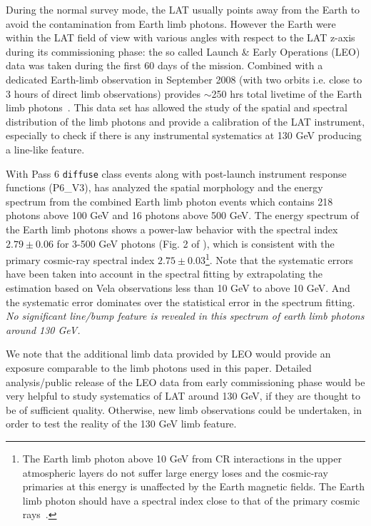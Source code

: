 \documentclass[aps,twocolumn,prd,superscriptaddress,showpacs,nofootinbib,fixfloat]{revtex4}
\begin{document}
During the normal survey mode, the LAT usually points away
from the Earth to avoid the contamination from Earth limb
photons. However the Earth were within the LAT field of view
with various angles with respect to the LAT z-axis during
its commissioning phase: the so called Launch \& Early
Operations (LEO) data was taken during the first 60 days of
the mission. Combined with a dedicated Earth-limb
observation in September 2008 (with two orbits i.e. close to
3 hours of direct limb observations) provides $\sim$250 hrs
total livetime of the Earth limb
photons~\cite{FermiLimb}. This data set has allowed the
study of the spatial and spectral distribution of the limb
photons and provide a calibration of the LAT instrument,
especially to check if there is any instrumental systematics
at 130 GeV producing a line-like feature.

With Pass 6 \texttt{diffuse} class events along with
post-launch instrument response functions (P6\_V3),
\cite{FermiLimb} has analyzed the spatial morphology and the
energy spectrum from the combined Earth limb photon events
which contains 218 photons above 100 GeV and 16 photons
above 500 GeV. The energy spectrum of the Earth limb photons
shows a power-law behavior with the spectral index $2.79\pm
0.06$ for 3-500 GeV photons (Fig. 2 of \cite{FermiLimb}),
which is consistent with the primary cosmic-ray spectral
index $2.75\pm 0.03$\footnote{The Earth limb photon above 10
  GeV from CR interactions in the upper atmospheric
  layers do not suffer large energy loses and the cosmic-ray
  primaries at this energy is unaffected by the Earth
  magnetic fields. The Earth limb photon should have a
  spectral index close to that of the primary cosmic
  rays~\cite{FermiLimb}. }. Note that the systematic errors
have been taken into account in the spectral fitting by
extrapolating the estimation based on Vela observations less
than 10 GeV to above 10 GeV. And the systematic error
dominates over the statistical error in the spectrum
fitting. \emph{No significant line/bump feature is revealed
  in this spectrum of earth limb photons around 130 GeV.}

We note that the additional limb data provided by LEO would
provide an exposure comparable to the limb photons used in
this paper. Detailed analysis/public release of the LEO data
from early commissioning phase would be very helpful to
study systematics of LAT around 130 GeV, if they are thought
to be of sufficient quality.  Otherwise, new limb
observations could be undertaken, in order to test the
reality of the 130 GeV limb feature.
\end{document}
